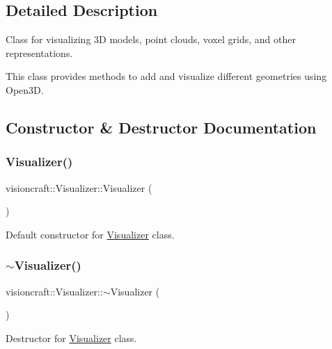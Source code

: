 \subsection{Detailed Description}
Class for visualizing 3D models, point clouds, voxel grids, and other representations. 

This class provides methods to add and visualize different geometries using Open3D. 

\subsection{Constructor \& Destructor Documentation}
\mbox{\label{classvisioncraft_1_1Visualizer_ae8779e7a8cddce5d4a864d048b0c3d2f}} 
\subsubsection{\texorpdfstring{Visualizer()}{Visualizer()}}
{\footnotesize\ttfamily visioncraft\+::\+Visualizer\+::\+Visualizer (\begin{DoxyParamCaption}{ }\end{DoxyParamCaption})}



Default constructor for \hyperlink{classvisioncraft_1_1Visualizer}{Visualizer} class. 

\mbox{\label{classvisioncraft_1_1Visualizer_a4235c5bd54d8814a5c671803b205e702}} 
\subsubsection{\texorpdfstring{$\sim$\+Visualizer()}{~Visualizer()}}
{\footnotesize\ttfamily visioncraft\+::\+Visualizer\+::$\sim$\+Visualizer (\begin{DoxyParamCaption}{ }\end{DoxyParamCaption})}



Destructor for \hyperlink{classvisioncraft_1_1Visualizer}{Visualizer} class. 



